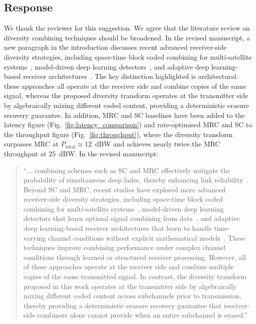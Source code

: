 \subsection{Response}

We thank the reviewer for this suggestion. We agree that the literature review on diversity combining techniques should be broadened. In the revised manuscript, a new paragraph in the introduction discusses recent advanced receiver-side diversity strategies, including space-time block coded combining for multi-satellite systems~\cite{Singh2024}, model-driven deep learning detectors~\cite{He2020DL, Hu2023DL}, and adaptive deep learning-based receiver architectures~\cite{Doha2025}. The key distinction highlighted is architectural: these approaches all operate at the receiver side and combine copies of the same signal, whereas the proposed diversity transform operates at the transmitter side by algebraically mixing different coded content, providing a deterministic erasure recovery guarantee. In addition, MRC and SC baselines have been added to the latency figure (Fig.~\ref{fig:latency_comparison}) and rate-optimised MRC and SC to the throughput figure (Fig.~\ref{fig:throughput}), where the diversity transform surpasses MRC at $P_{\mathrm{total}} \approx 12$~dBW and achieves nearly twice the MRC throughput at 25~dBW. In the revised manuscript:

\begin{quote}
``$\ldots$ combining schemes such as SC and MRC effectively mitigate the probability of simultaneous deep fades, thereby enhancing link reliability~\cite{Cacuango2025}. {\color{blue}Beyond SC and MRC, recent studies have explored more advanced receiver-side diversity strategies, including space-time block coded combining for multi-satellite systems~\cite{Singh2024}, model-driven deep learning detectors that learn optimal signal combining from data~\cite{He2020DL, Hu2023DL}, and adaptive deep learning-based receiver architectures that learn to handle time-varying channel conditions without explicit mathematical models~\cite{Doha2025}. These techniques improve combining performance under complex channel conditions through learned or structured receiver processing. However, all of these approaches operate at the receiver side and combine multiple copies of the same transmitted signal. In contrast, the diversity transform proposed in this work operates at the transmitter side by algebraically mixing different coded content across subchannels prior to transmission, thereby providing a deterministic erasure recovery guarantee that receiver-side combiners alone cannot provide when an entire subchannel is erased.}''
\end{quote}

